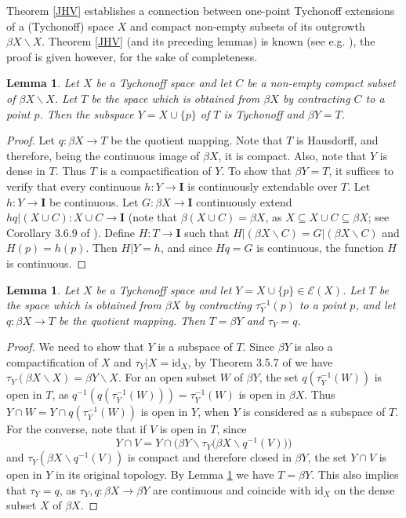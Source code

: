 \documentclass{amsart}
\newtheorem{lemma}[theorem]{Lemma}
\theoremstyle{definition}
\theoremstyle{remark}
\theoremstyle{notation}
\numberwithin{equation}{section}
\begin{document}
Theorem \ref{JHV} establishes  a connection between one-point Tychonoff extensions of a (Tychonoff) space $X$ and compact non-empty
subsets of its outgrowth $\beta X\backslash X$. Theorem \ref{JHV} (and its preceding lemmas) is known (see e.g. \cite{MRW1}), the  proof  is given  however, for the sake of completeness.

\begin{lemma}\label{KFH}
Let $X$ be a Tychonoff  space and let $C$ be a non-empty compact subset of $\beta X\backslash X$. Let $T$ be the space which is obtained from $\beta X$
by contracting $C$ to a point $p$. Then the subspace $Y=X\cup\{p\}$ of $T$ is Tychonoff and $\beta Y=T$.
\end{lemma}

\begin{proof}
Let $q:\beta X\rightarrow T$ be the quotient mapping. Note that $T$ is Hausdorff, and therefore, being the continuous image of $\beta X$, it is compact.
Also, note that $Y$ is dense in $T$. Thus $T$ is a compactification of $Y$. To show that $\beta Y=T$, it suffices to verify that every continuous
$h:Y\rightarrow{\mathbf I}$ is continuously extendable over $T$. Let $h:Y\rightarrow{\mathbf I}$ be  continuous.  Let $G:\beta X\rightarrow{\mathbf I}$  continuously extend $hq|(X\cup C):X\cup C\rightarrow{\mathbf I}$
(note that $\beta(X\cup C)=\beta X$, as $X\subseteq X\cup C\subseteq \beta X$; see Corollary 3.6.9 of \cite{E}). Define  $H:T\rightarrow{\mathbf I}$ such that
$H|(\beta X\backslash C)=G|(\beta X\backslash C)$ and $H(p)=h(p)$. Then $H|Y=h$, and since $Hq=G$ is continuous, the function $H$ is continuous.
\end{proof}

\begin{lemma}\label{JFV}
Let $X$ be a Tychonoff space and let $Y=X\cup\{p\}\in {\mathscr E}(X)$. Let $T$ be the
space which is obtained from $\beta X$ by contracting  $\tau_Y^{-1}(p)$ to a
point $p$, and let $q:\beta X\rightarrow T$ be the
quotient mapping. Then $T=\beta Y$  and $\tau_Y=q$.
\end{lemma}

\begin{proof}
We need to show that $Y$ is a subspace of $T$. Since $\beta Y$ is also a compactification of $X$ and
$\tau_Y|X=\mbox{id}_X$, by Theorem 3.5.7 of \cite{E} we have  $\tau_Y(\beta X\backslash X)=\beta Y\backslash X$.  For an open subset $W$ of $\beta Y$, the set  $q(\tau_Y^{-1}(W))$ is open in $T$, as $q^{-1}(q(\tau_Y^{-1}(W)))=\tau_Y^{-1}(W)$ is open in $\beta X$. Thus $Y\cap W= Y\cap q(\tau_Y^{-1}(W))$ is open in $Y$, when $Y$ is considered as  a subspace of $T$. For the converse, note that if $V$ is open in $T$, since
\[Y\cap V=Y\cap \big(\beta Y\backslash\tau_Y\big(\beta X\backslash q^{-1}(V)\big)\big)\]
and  $\tau_Y(\beta X\backslash q^{-1}(V))$ is compact and therefore closed in $\beta Y$, the set $Y\cap V$ is open in $Y$ in its original topology.
By Lemma \ref{KFH} we have $T=\beta Y$. This
also implies that $\tau_Y=q$, as $\tau_Y,q:\beta X\rightarrow\beta Y$ are
continuous and coincide with $\mbox{id}_X$ on the dense subset $X$ of $\beta X$.
\end{proof}
\end{document}
